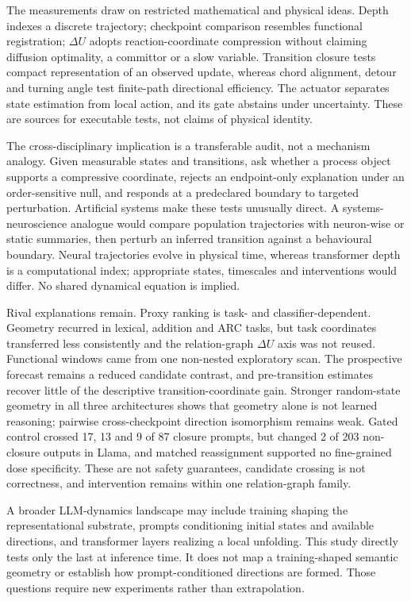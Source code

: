\documentclass[11pt]{article}
\begin{document}
The measurements draw on restricted mathematical and physical ideas. Depth indexes a discrete trajectory; checkpoint comparison resembles functional registration; $\Delta U$ adopts reaction-coordinate compression without claiming diffusion optimality, a committor or a slow variable. Transition closure tests compact representation of an observed update, whereas chord alignment, detour and turning angle test finite-path directional efficiency. The actuator separates state estimation from local action, and its gate abstains under uncertainty. These are sources for executable tests, not claims of physical identity.

The cross-disciplinary implication is a transferable audit, not a mechanism analogy. Given measurable states and transitions, ask whether a process object supports a compressive coordinate, rejects an endpoint-only explanation under an order-sensitive null, and responds at a predeclared boundary to targeted perturbation. Artificial systems make these tests unusually direct. A systems-neuroscience analogue would compare population trajectories with neuron-wise or static summaries, then perturb an inferred transition against a behavioural boundary. Neural trajectories evolve in physical time, whereas transformer depth is a computational index; appropriate states, timescales and interventions would differ. No shared dynamical equation is implied.

Rival explanations remain. Proxy ranking is task- and classifier-dependent. Geometry recurred in lexical, addition and ARC tasks, but task coordinates transferred less consistently and the relation-graph $\Delta U$ axis was not reused. Functional windows came from one non-nested exploratory scan. The prospective forecast remains a reduced candidate contrast, and pre-transition estimates recover little of the descriptive transition-coordinate gain. Stronger random-state geometry in all three architectures shows that geometry alone is not learned reasoning; pairwise cross-checkpoint direction isomorphism remains weak. Gated control crossed 17, 13 and 9 of 87 closure prompts, but changed 2 of 203 non-closure outputs in Llama, and matched reassignment supported no fine-grained dose specificity. These are not safety guarantees, candidate crossing is not correctness, and intervention remains within one relation-graph family.

A broader LLM-dynamics landscape may include training shaping the representational substrate, prompts conditioning initial states and available directions, and transformer layers realizing a local unfolding. This study directly tests only the last at inference time. It does not map a training-shaped semantic geometry or establish how prompt-conditioned directions are formed. Those questions require new experiments rather than extrapolation.
\end{document}

